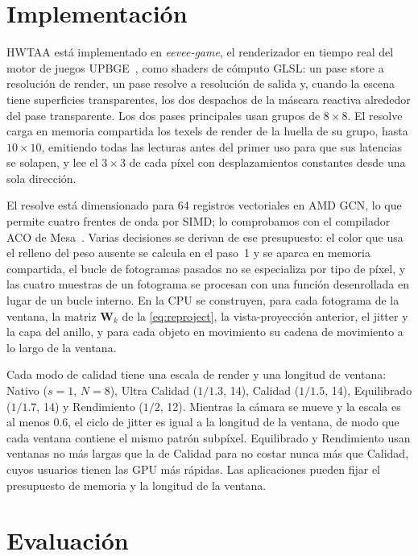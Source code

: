 \documentclass[11pt,a4paper]{article}
\begin{document}
\section{Implementación}
\label{sec:implementation}

HWTAA está implementado en \emph{eevee-game}, el renderizador en tiempo real del motor de juegos UPBGE~\cite{upbge}, como shaders de cómputo GLSL: un pase store a resolución de render, un pase resolve a resolución de salida y, cuando la escena tiene superficies transparentes, los dos despachos de la máscara reactiva alrededor del pase transparente. Los dos pases principales usan grupos de $8\times8$. El resolve carga en memoria compartida los texels de render de la huella de su grupo, hasta $10\times10$, emitiendo todas las lecturas antes del primer uso para que sus latencias se solapen, y lee el $3\times3$ de cada píxel con desplazamientos constantes desde una sola dirección.

El resolve está dimensionado para 64 registros vectoriales en AMD GCN, lo que permite cuatro frentes de onda por SIMD; lo comprobamos con el compilador ACO de Mesa~\cite{mesa}. Varias decisiones se derivan de ese presupuesto: el color que usa el relleno del peso ausente se calcula en el paso~1 y se aparca en memoria compartida, el bucle de fotogramas pasados no se especializa por tipo de píxel, y las cuatro muestras de un fotograma se procesan con una función desenrollada en lugar de un bucle interno. En la CPU se construyen, para cada fotograma de la ventana, la matriz $\mathbf{W}_k$ de la \cref{eq:reproject}, la vista-proyección anterior, el jitter y la capa del anillo, y para cada objeto en movimiento su cadena de movimiento a lo largo de la ventana.

Cada modo de calidad tiene una escala de render y una longitud de ventana: Nativo ($s=1$, $N=8$), Ultra Calidad ($1/1.3$, 14), Calidad ($1/1.5$, 14), Equilibrado ($1/1.7$, 14) y Rendimiento ($1/2$, 12). Mientras la cámara se mueve y la escala es al menos 0.6, el ciclo de jitter es igual a la longitud de la ventana, de modo que cada ventana contiene el mismo patrón subpíxel. Equilibrado y Rendimiento usan ventanas no más largas que la de Calidad para no costar nunca más que Calidad, cuyos usuarios tienen las GPU más rápidas. Las aplicaciones pueden fijar el presupuesto de memoria y la longitud de la ventana.

\section{Evaluación}
\label{sec:evaluation}
\end{document}
